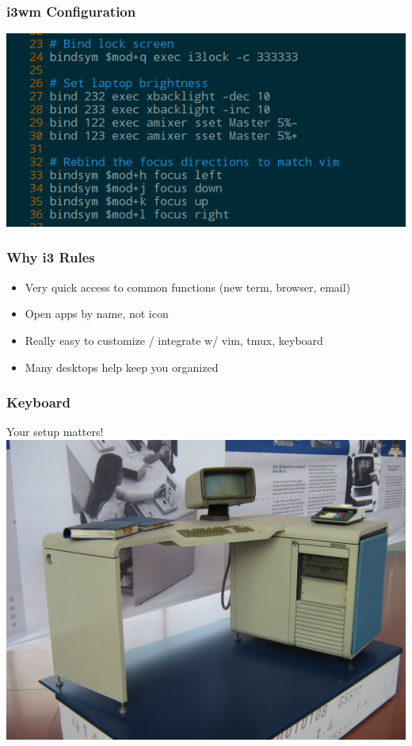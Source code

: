 \documentclass{beamer}
\begin{document}
\begin{frame}
  \frametitle{i3wm Configuration}
  \includegraphics[scale=0.5]{images/i3-lock-and-move-config}
\end{frame}

\begin{frame}
  \frametitle{Why i3 Rules}
  \begin{itemize}
    \item Very quick access to common functions (new term, browser, email)
    \item Open apps by name, not icon
    \item Really easy to customize / integrate w/ vim, tmux, keyboard
    \item Many desktops help keep you organized
  \end{itemize}
\end{frame}

\begin{frame}
  \frametitle{Keyboard}
  Your setup matters!
  \includegraphics[scale=0.1]{images/awesome-system}
\end{frame}
\end{document}
